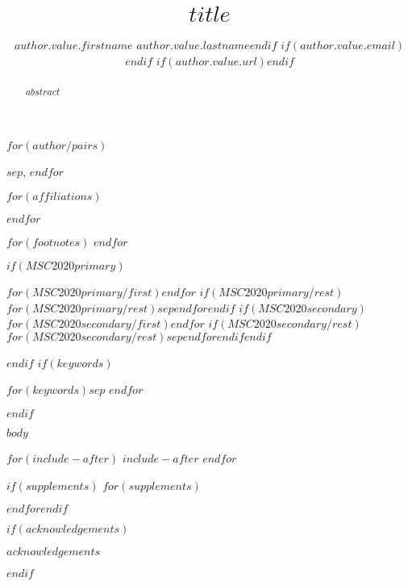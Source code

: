 \documentclass[ba]{imsart}
\numberwithin{equation}{section}
\theoremstyle{plain}
\begin{document}
\begin{frontmatter}

\title{$title$}

\begin{aug}
$for(author/pairs)$
\author{$author.value.firstname$ $author.value.lastname$$endif$
$if(author.value.email)$$endif$
$if(author.value.url)$$endif$}$sep$, $endfor$


$for(affiliations)$ %
\address[$affiliations.ref$]{$affiliations.name$,$affiliations.address$ $for(author/pairs)$
$if(it.value.email)$
\ifstrequal{$affiliations.ref$}{$it.value.affiliationref$}{\printead{ea-$affiliations.ref$-$it.key$}}{}
$endif$
$if(it.value.url)$
\ifstrequal{$affiliations.ref$}{$it.value.affiliationref$}{\printead{ua-$affiliations.ref$-$it.key$}}{}
$endif$
$sep$ $endfor$%
}$endfor$%

$for(footnotes)$
$endfor$

\end{aug}

\begin{abstract}
$abstract$
\end{abstract}

$if(MSC2020primary)$ \begin{keyword}[class=MSC]
$for(MSC2020primary/first)$$endfor$
$if(MSC2020primary/rest)$$for(MSC2020primary/rest)$$sep $$endfor$$endif$
$if(MSC2020secondary)$$for(MSC2020secondary/first)$$endfor$
$if(MSC2020secondary/rest)$$for(MSC2020secondary/rest)$$sep $$endfor$$endif$$endif$\end{keyword}$endif$
$if(keywords)$ \begin{keyword} $for(keywords)$$sep$ $endfor$\end{keyword}$endif$
\end{frontmatter}

$body$

$for(include-after)$
$include-after$
$endfor$

$if(supplements)$
$for(supplements)$
\begin{supplement}
\end{supplement}
$endfor$$endif$

$if(acknowledgements)$
\begin{acks}[Acknowledgments]
$acknowledgements$
\end{acks}
$endif$



\end{document}
